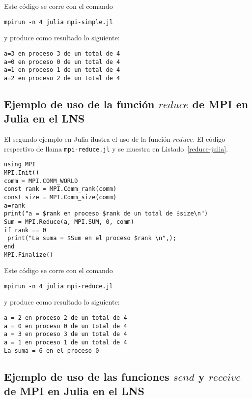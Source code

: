 \documentclass[letter]{jpconf}
\begin{document}
Este c\'odigo se corre con el comando
\color{blue}
\begin{verbatim}
mpirun -n 4 julia mpi-simple.jl 
\end{verbatim}
\color{black}
y produce como resultado lo siguiente:
\color{brown}
\begin{verbatim}
a=3 en proceso 3 de un total de 4
a=0 en proceso 0 de un total de 4
a=1 en proceso 1 de un total de 4
a=2 en proceso 2 de un total de 4
\end{verbatim}
\color{black}


\subsection{Ejemplo de uso de la funci\'on $reduce$ de MPI en Julia en el LNS}

El segundo ejemplo en Julia ilustra el uso de la funci\'on $reduce$. El c\'odigo respectivo de llama  \texttt{mpi-reduce.jl} y se muestra en Listado~\ref{reduce-julia}.
\begin{lstlisting}[float,floatplacement=H,label=reduce-julia,caption=Listado del programa  \texttt{mpi-reduce.jl} en Julia]
using MPI
MPI.Init()
comm = MPI.COMM_WORLD
const rank = MPI.Comm_rank(comm)
const size = MPI.Comm_size(comm)
a=rank
print("a = $rank en proceso $rank de un total de $size\n")
Sum = MPI.Reduce(a, MPI.SUM, 0, comm)
if rank == 0
 print("La suma = $Sum en el proceso $rank \n",);
end
MPI.Finalize() 
\end{lstlisting}


Este c\'odigo se corre con el comando
\color{blue}
\begin{verbatim}
mpirun -n 4 julia mpi-reduce.jl
\end{verbatim}
\color{black}
y produce como resultado lo siguiente:
\color{brown}
\begin{verbatim}
a = 2 en proceso 2 de un total de 4
a = 0 en proceso 0 de un total de 4
a = 3 en proceso 3 de un total de 4
a = 1 en proceso 1 de un total de 4
La suma = 6 en el proceso 0 
\end{verbatim}
\color{black}


\subsection{Ejemplo de uso de las funciones $send$ y $receive$ de MPI en Julia en el LNS}
\end{document}
